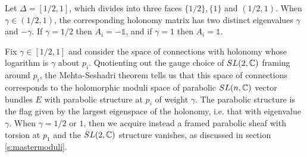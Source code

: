 	Let $\Delta = [1/2,1]$, which divides into three faces $\{1/2\}, \{1\}$ and $(1/2,1)$. When $\gamma \in (1/2,1)$, the corresponding holonomy matrix has two distinct eigenvalues $\gamma$ and $-\gamma$.  If $\gamma=1/2$ then $A_i = -\mathds{1}$, and if $\gamma = 1$ then $A_i = \mathds{1}$.
	
	Fix $\gamma \in [1/2,1]$ and consider the space of connections with holonomy whose logarithm is $\gamma$ about $p_i$. Quotienting out the gauge choice of $SL(2,\mathbb{C})$ framing around $p_i$, the Mehta-Seshadri theorem \cite{mehta_moduli_1980} tells us that this space of connections corresponds to the holomorphic moduli space of parabolic $SL(n,\mathbb{C})$ vector bundles $E$ with parabolic structure at $p_i$ of weight $\gamma$. The parabolic structure is the flag given by the largest eigenspace of the holonomy, i.e. that with eigenvalue $\gamma$. When $\gamma = 1/2$ or $1$, then we acquire instead a framed parabolic sheaf with torsion at $p_1$ and the $SL(2,\mathbb{C})$ structure vanishes, as discussed in section \ref{s:mastermoduli}.
		
